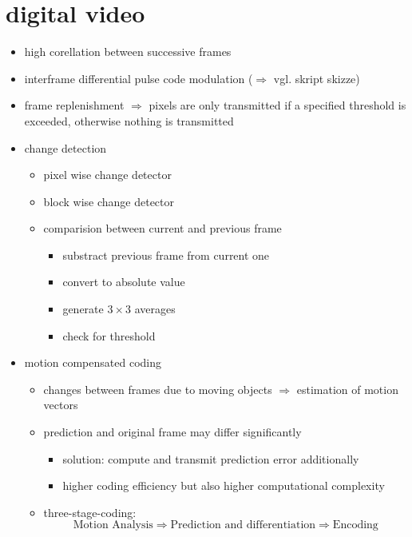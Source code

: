 \documentclass[a4paper,10pt]{scrreprt}
\begin{document}
\section{digital video}
\begin{itemize}
 \item high corellation between successive frames
 \item interframe differential pulse code modulation ($\Rightarrow$ vgl. skript skizze)
 \item frame replenishment $\Rightarrow$ pixels are only transmitted if a specified threshold is exceeded, otherwise nothing is transmitted
 \item change detection
 \begin{itemize}
  \item pixel wise change detector
  \item block wise change detector
  \item comparision between current and previous frame
  \begin{itemize}
   \item substract previous frame from current one
   \item convert to absolute value
   \item generate $3\times 3$ averages
   \item check for threshold
  \end{itemize}
 \end{itemize}
 \item motion compensated coding 
 \begin{itemize}
  \item changes between frames due to moving objects $\Rightarrow$ estimation of motion vectors
  \item prediction and original frame may differ significantly
  \begin{itemize}
   \item solution: compute and transmit prediction error additionally
   \item higher coding efficiency but also higher computational complexity
  \end{itemize}
  \item three-stage-coding:
  \[ \text{Motion Analysis} \Rightarrow \text{Prediction and differentiation} \Rightarrow \text{Encoding} \]

 \end{itemize}

\end{itemize}
\end{document}
